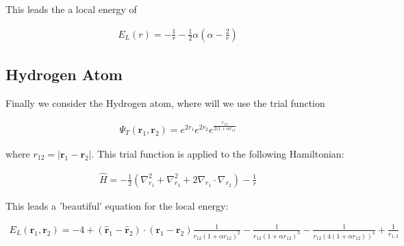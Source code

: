 This leads the a local energy of

  \begin{align}
    E_L(r) = - \frac{1}{r} - \frac{1}{2}\alpha(\alpha - \frac{2}{r})
  \end{align}

\subsection{Hydrogen Atom}
Finally we consider the Hydrogen atom, where will we use the trial function 

  \begin{align}
    \Psi_T (\textbf{r}_1,\textbf{r}_2) = e^{2r_1}e^{2r_2}e^{\frac{r_{12}}{2(1+\alpha r_{12}}} 
  \end{align}

where $r_{12} = |\textbf{r}_1 - \textbf{r}_2 |$. This trial function is applied to the following Hamiltonian:
  
  \begin{align}
    \hat{H} = -\frac{1}{2}(\nabla_{r_1}^2 + \nabla_{r_3}^2 + 2\nabla_{r_1}\cdot \nabla_{r_2}) - \frac{1}{r}
  \end{align}
  
This leads a 'beautiful' equation for the local energy:

  \begin{align}
    E_L(\textbf{r}_1,\textbf{r}_2) = -4  + (\hat{\textbf{r}}_1 - \hat{\textbf{r}}_2) \cdot (\textbf{r}_1 - \textbf{r}_2) \frac{1}{r_{12}(1+\alpha r_{12})^2} -  \frac{1}{r_{12}(1+\alpha r_{12})^3} - \frac{1}{r_{12}(4(1+\alpha r_{12}))^4} + \frac{1}{r_{1,2}}   \end{align}
  
